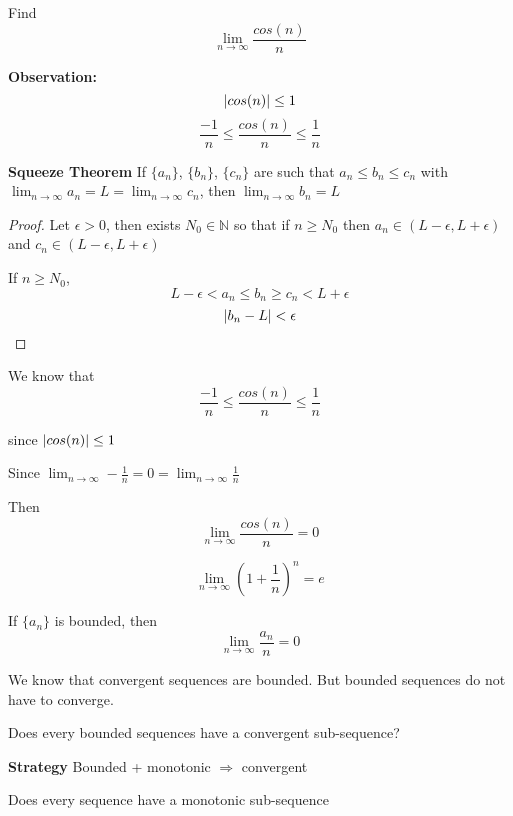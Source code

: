 

\begin{exmp}
Find $$\lim_{n\to\infty} \frac{cos(n)}{n}$$
\end{exmp}
\textbf{Observation: } 
\[\left| cos(n) \right| \leq 1\]
\[\frac{-1}{n} \leq \frac{cos(n)}{n}\leq \frac{1}{n}\]


\begin{thm}\textbf{Squeeze Theorem}
If $\{a_n\}$, $\{b_n\}$, $\{c_n\}$ are such that $a_n\leq b_n\leq c_n$ with $\lim_{n\to\infty} a_n = L = \lim_{n\to\infty} c_n$, then $\lim_{n\to\infty} b_n = L$
\end{thm}

\begin{proof}
Let $\epsilon > 0$, then exists $N_0\in\mathbb{N}$ so that if $n\geq N_0$ then $a_n \in (L-\epsilon,L+\epsilon)$ and $c_n \in (L-\epsilon,L+\epsilon)$

If $n\geq N_0$, \[L-\epsilon < a_n \leq b_n \geq c_n < L+\epsilon\]
\[\left| b_n - L \right| < \epsilon\]
\end{proof}

\begin{solution}

We know that \[\frac{-1}{n} \leq \frac{cos(n)}{n}\leq \frac{1}{n}\]

since $\left| cos(n) \right| \leq 1$

Since $\lim_{n\to\infty} -\frac{1}{n} = 0 = \lim_{n\to \infty} \frac{1}{n}$

Then 
\[\lim_{n\to\infty} \frac{cos(n)}{n} = 0\]


\end{solution}

\begin{exmp}
\[
\lim_{n\to\infty} (1+\frac{1}{n})^n = e
\]
\end{exmp}

\begin{note}
If $\{a_n\}$ is bounded, then 
\[
\lim_{n\to\infty} \frac{a_n}{n} = 0
\]
\end{note}


\begin{note}
We know that convergent sequences are bounded. But bounded sequences do not have to converge.

Does every bounded sequences have a convergent sub-sequence?



\textbf{Strategy} Bounded + monotonic $\Rightarrow$ convergent

Does every sequence have a monotonic sub-sequence

\end{note}

